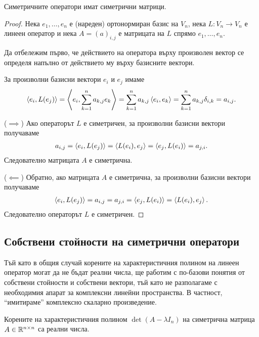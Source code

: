 \documentclass[numbers=endperiod, bibliography=totocnumbered]{scrartcl}
\begin{document}
\begin{theorem}
  Симетричните оператори имат симетрични матрици.
\end{theorem}
\begin{proof}
  Нека \( e_1, \ldots, e_n \) е (нареден) ортонормиран базис на \( V_n \), нека \( L: V_n \to V_n \) е линеен оператор и нека \( A = {(a)}_{i,j} \) е матрицата на \( L \) спрямо \( e_1, \ldots, e_n \).

  Да отбележим първо, че действието на оператора върху произволен вектор се определя напълно от действието му върху базисните вектори.

  За произволни базисни вектори \( e_i \) и \( e_j \) имаме
  \begin{align*}
    \left\langle e_i, L(e_j) \right\rangle
    =
    \left\langle e_i, \sum_{k=1}^n a_{k,j} e_k \right\rangle
    =
    \sum_{k=1}^n a_{k,j} \left\langle e_i, e_k \right\rangle
    =
    \sum_{k=1}^n a_{k,j} \delta_{i,k}
    =
    a_{i,j}.
  \end{align*}

  (\( \implies \)) Ако операторът \( L \) е симетричен, за произволни базисни вектори получаваме
  \begin{align*}
    a_{i,j}
    =
    \left\langle e_i, L(e_j) \right\rangle
    =
    \left\langle L(e_i), e_j \right\rangle
    =
    \left\langle e_j, L(e_i) \right\rangle
    =
    a_{j,i}.
  \end{align*}
  Следователно матрицата \( A \) е симетрична.

  (\( \impliedby \)) Обратно, ако матрицата \( A \) е симетрична, за произволни базисни вектори получаваме
  \begin{align*}
    \left\langle e_i, L(e_j) \right\rangle
    =
    a_{i,j}
    =
    a_{j,i}
    =
    \left\langle e_j, L(e_i) \right\rangle
    =
    \left\langle L(e_i), e_j \right\rangle.
  \end{align*}
  Следователно операторът \( L \) е симетричен.
\end{proof}

\subsection{Собствени стойности на симетрични оператори}

Тъй като в общия случай корените на характеристичния полином на линеен оператор могат да не бъдат реални числа, ще работим с по-базови понятия от собствени стойности и собствени вектори, тъй като не разполагаме с необходимия апарат за комплексни линейни пространства. В частност, \enquote{имитираме} комплексно скаларно произведение.

\begin{theorem}
  Корените на характеристичния полином \( \det(A - \lambda I_n) \) на симетрична матрица \( A \in \mathbb{R}^{n \times n} \) са реални числа.
\end{theorem}
\end{document}
